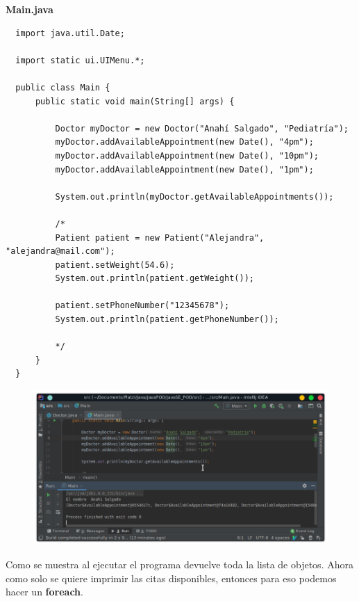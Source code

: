 \documentclass{article}
\begin{document}
\textbf{Main.java}
\begin{verbatim}
  import java.util.Date;

  import static ui.UIMenu.*;

  public class Main {
      public static void main(String[] args) {

          Doctor myDoctor = new Doctor("Anahí Salgado", "Pediatría");
          myDoctor.addAvailableAppointment(new Date(), "4pm");
          myDoctor.addAvailableAppointment(new Date(), "10pm");
          myDoctor.addAvailableAppointment(new Date(), "1pm");

          System.out.println(myDoctor.getAvailableAppointments());

          /*
          Patient patient = new Patient("Alejandra", "alejandra@mail.com");
          patient.setWeight(54.6);
          System.out.println(patient.getWeight());

          patient.setPhoneNumber("12345678");
          System.out.println(patient.getPhoneNumber());

          */
      }
  }
\end{verbatim}

\begin{figure}[h!]
  \centering
  \includegraphics[scale=0.5]{./Pictures/040_clases_anidadas.png}
\end{figure}

Como se muestra al ejecutar el programa devuelve toda la lista de objetos.
Ahora como solo se quiere imprimir las citas disponibles, entonces para eso
podemos hacer un  \textbf{foreach}.\\
\end{document}
